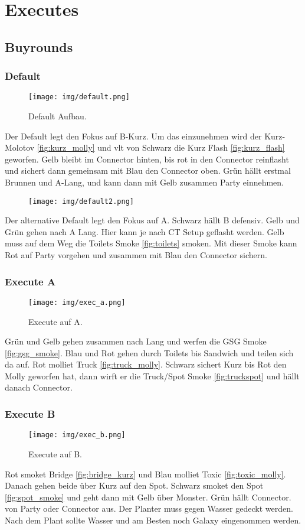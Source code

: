 \section{Executes}
\subsection{Buyrounds}
\subsubsection{Default}
\begin{figure}
    \centering
    \texttt{[image: img/default.png]}
    \caption{Default Aufbau.}
    \label{fig:default}
\end{figure}
Der Default legt den Fokus auf B-Kurz. Um das einzunehmen wird der Kurz-Molotov \ref{fig:kurz_molly} und vlt von Schwarz die Kurz Flash \ref{fig:kurz_flash} geworfen.
Gelb bleibt im Connector hinten, bis rot in den Connector reinflasht und sichert dann gemeinsam mit Blau den Connector oben. 
Grün hällt erstmal Brunnen und A-Lang, und kann dann mit Gelb zusammen Party einnehmen.
\begin{figure}
    \centering
    \texttt{[image: img/default2.png]}
    \label{fig:default2}
\end{figure}
Der alternative Default legt den Fokus auf A. Schwarz hällt B defensiv. Gelb und Grün gehen nach A Lang. Hier kann je nach CT Setup geflasht werden. Gelb muss auf dem Weg die Toilets Smoke \ref{fig:toilets} smoken.
Mit dieser Smoke kann Rot auf Party vorgehen und zusammen mit Blau den Connector sichern.
\FloatBarrier
\subsubsection{Execute A}
\begin{figure}
    \centering
    \texttt{[image: img/exec\_a.png]}
    \caption{Execute auf A.}
    \label{fig:exec_a}
\end{figure}
Grün und Gelb gehen zusammen nach Lang und werfen die GSG Smoke \ref{fig:gsg_smoke}. Blau und Rot gehen durch Toilets bis Sandwich und teilen sich da auf. 
Rot molliet Truck \ref{fig:truck_molly}. Schwarz sichert Kurz bis Rot den Molly geworfen hat, dann wirft er die Truck/Spot Smoke \ref{fig:truckspot} und hällt danach Connector.
\FloatBarrier
\subsubsection{Execute B}
\begin{figure}
    \centering
    \texttt{[image: img/exec\_b.png]}
    \caption{Execute auf B.}
    \label{fig:exec_b}
\end{figure}
Rot smoket Bridge \ref{fig:bridge_kurz} und Blau molliet Toxic \ref{fig:toxic_molly}. Danach gehen beide über Kurz auf den Spot. 
Schwarz smoket den Spot \ref{fig:spot_smoke} und geht dann mit Gelb über Monster. Grün hällt Connector. von Party oder Connector aus. Der Planter muss gegen Wasser gedeckt werden.
 Nach dem Plant sollte Wasser und am Besten noch Galaxy eingenommen werden.
 \FloatBarrier

